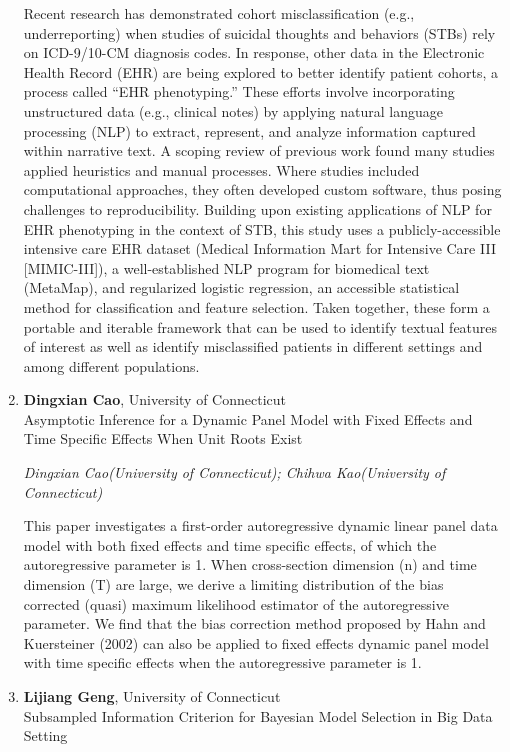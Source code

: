 \begin{enumerate}
Recent research has demonstrated cohort misclassification (e.g., underreporting) when studies of suicidal thoughts and behaviors (STBs) rely on ICD-9/10-CM diagnosis codes. In response, other data in the Electronic Health Record (EHR) are being explored to better identify patient cohorts, a process called “EHR phenotyping.” These efforts involve incorporating unstructured data (e.g., clinical notes) by applying natural language processing (NLP) to extract, represent, and analyze information captured within narrative text. A scoping review of previous work found many studies applied heuristics and manual processes. Where studies included computational approaches, they often developed custom software, thus posing challenges to reproducibility. Building upon existing applications of NLP for EHR phenotyping in the context of STB, this study uses a publicly-accessible intensive care EHR dataset (Medical Information Mart for Intensive Care III [MIMIC-III]), a well-established NLP program for biomedical text (MetaMap), and regularized logistic regression, an accessible statistical method for classification and feature selection. Taken together, these form a portable and iterable framework that can be used to identify textual features of interest as well as identify misclassified patients in different settings and among different populations.

\item \textbf{Dingxian Cao}, University of Connecticut \\
Asymptotic Inference for a Dynamic Panel Model with Fixed Effects and Time Specific Effects When Unit Roots Exist

\emph{\footnotesize Dingxian Cao(University of Connecticut); Chihwa Kao(University of Connecticut)}

This paper investigates a first-order autoregressive dynamic linear panel data model with both fixed effects and time specific effects, of which the autoregressive parameter is 1. When cross-section dimension (n) and time dimension (T) are large, we derive a limiting distribution of the bias corrected (quasi) maximum likelihood estimator of the autoregressive parameter. We find that the bias correction method proposed by Hahn and Kuersteiner (2002) can also be applied to fixed effects dynamic panel model with time specific effects when the autoregressive parameter is 1.

\item \textbf{Lijiang Geng}, University of Connecticut \\
Subsampled Information Criterion for Bayesian Model Selection in Big Data Setting


\end{enumerate}
